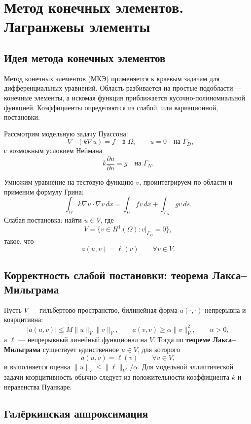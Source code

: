 \section{Метод конечных элементов. Лагранжевы элементы}
\label{sec:fem-lagrange}

\subsection{Идея метода конечных элементов}

Метод конечных элементов (МКЭ) применяется к краевым задачам для
дифференциальных уравнений. Область разбивается на простые подобласти ---
конечные элементы, а искомая функция приближается кусочно-полиномиальной
функцией. Коэффициенты определяются из слабой, или вариационной, постановки.

Рассмотрим модельную задачу Пуассона:
\[
    -\nabla\cdot(k\nabla u)=f\quad\text{в }\Omega,
    \qquad
    u=0\quad\text{на }\Gamma_D,
\]
с возможным условием Неймана
\[
    k\frac{\partial u}{\partial n}=g\quad\text{на }\Gamma_N.
\]

Умножим уравнение на тестовую функцию $v$, проинтегрируем по области и применим
формулу Грина:
\[
    \int_{\Omega} k\nabla u\cdot\nabla v\,dx
    =
    \int_{\Omega}fv\,dx+
    \int_{\Gamma_N}gv\,ds.
\]
Слабая постановка: найти $u\in V$, где
\[
    V=\{v\in H^1(\Omega):v|_{\Gamma_D}=0\},
\]
такое, что
\[
    a(u,v)=\ell(v)
    \qquad\forall v\in V.
\]

\subsection{Корректность слабой постановки: теорема Лакса--Мильграма}

Пусть $V$ --- гильбертово пространство, билинейная форма $a(\cdot,\cdot)$
непрерывна и коэрцитивна:
\[
    |a(u,v)|\le M\|u\|_V\|v\|_V,
    \qquad
    a(v,v)\ge \alpha\|v\|_V^2,
    \qquad \alpha>0,
\]
а $\ell$ --- непрерывный линейный функционал на $V$. Тогда по
\textbf{теореме Лакса--Мильграма} существует единственное $u\in V$, для которого
\[
    a(u,v)=\ell(v)\qquad\forall v\in V,
\]
и выполняется оценка $\|u\|_V\le \|\ell\|_{V^*}/\alpha$.
Для модельной эллиптической задачи коэрцитивность обычно следует из
положительности коэффициента $k$ и неравенства Пуанкаре.

\subsection{Галёркинская аппроксимация}

